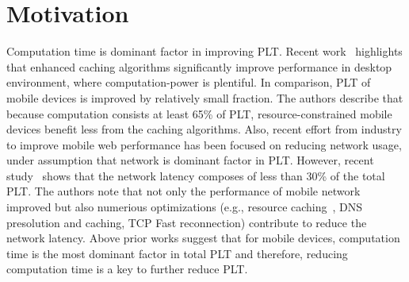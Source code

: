 \section{Motivation}
\label{sec:motivation}

Computation time is dominant factor in improving PLT.  Recent
work~\cite{chrome} highlights that enhanced caching algorithms
significantly improve performance in desktop environment, where
computation-power is plentiful. In comparison, PLT of mobile devices
is improved by relatively small fraction. The authors describe that
because computation consists at least 65\% of PLT,
resource-constrained mobile devices benefit less from the caching
algorithms. 
Also, recent effort from industry to improve mobile web performance
has been focused on reducing network usage, under assumption that
network is dominant factor in PLT. However, recent
study~\cite{njait2016www} shows that the network latency composes of
less than 30\% of the total PLT. The authors note that not only the
performance of mobile network improved but also numerious
optimizations (e.g., resource caching~\cite{vesuna2016caching}, DNS
presolution and caching, TCP Fast reconnection) contribute to reduce
the network latency.
Above prior works suggest that for mobile devices, computation time is
the most dominant factor in total PLT and therefore, reducing
computation time is a key to further reduce PLT.

